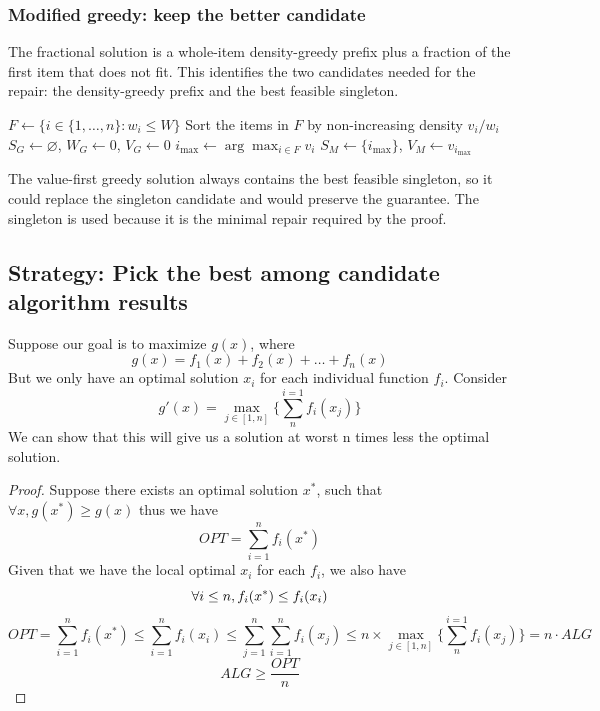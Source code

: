 \documentclass[10pt]{article}
\theoremstyle{definition}
\begin{document}
\subsubsection*{Modified greedy: keep the better candidate}
The fractional solution is a whole-item density-greedy prefix plus a fraction of the first item that does not fit. This identifies the two candidates needed for the repair: the density-greedy prefix and the best feasible singleton.

\begin{algorithm}[H]
  \caption{Modified two-candidate greedy for 0/1 knapsack}
  $F \gets \{i \in \{1,\ldots,n\}:w_i\leq W\}$\;
  Sort the items in $F$ by non-increasing density $v_i/w_i$\;
  $S_G \gets \varnothing$, $W_G \gets 0$, $V_G \gets 0$\;
  $i_{\max}\gets\arg\max_{i\in F}v_i$\;
  $S_M\gets\{i_{\max}\}$, $V_M\gets v_{i_{\max}}$\;
\end{algorithm}

The value-first greedy solution always contains the best feasible singleton, so it could replace the singleton candidate and would preserve the guarantee. The singleton is used because it is the minimal repair required by the proof.

\subsection{Strategy: Pick the best among candidate algorithm results}
Suppose our goal is to maximize $g(x)$,  where
\[g(x) = f_1(x) + f_2(x) + \dots + f_n(x)\]
But we only have an optimal solution $x_i$ for each individual function $f_i$. Consider 
\[g'(x) = \max_{j \in [1, n]}\{\sum_{n}^{i = 1} f_i(x_j)\}\]
We can show that this will give us a solution at worst n times less the optimal solution. 
\begin{proof}
  Suppose there exists an optimal solution $x^*$, such that $\forall x, g(x^*) \geq g(x)$
  thus we have 
  \[OPT = \sum_{i=1}^{n} f_i(x^*)\]
  Given that we have the local optimal $x_i$ for each $f_i$, we also have
    \[\forall i \leq n,f_i(x^*) \leq f_i(x_i)\\\]
    \[OPT = \sum_{i=1}^{n} f_i(x^*) \leq \sum_{i=1}^{n} f_i(x_i) \leq \sum_{j=1}^{n}\sum_{i=1}^{n}f_i(x_j) \leq n \times \max_{j \in [1, n]}\{\sum_{n}^{i = 1} f_i(x_j)\} = n\cdot ALG\]
    \[ALG\geq \frac{OPT}{n}\]
\end{proof}
\end{document}
